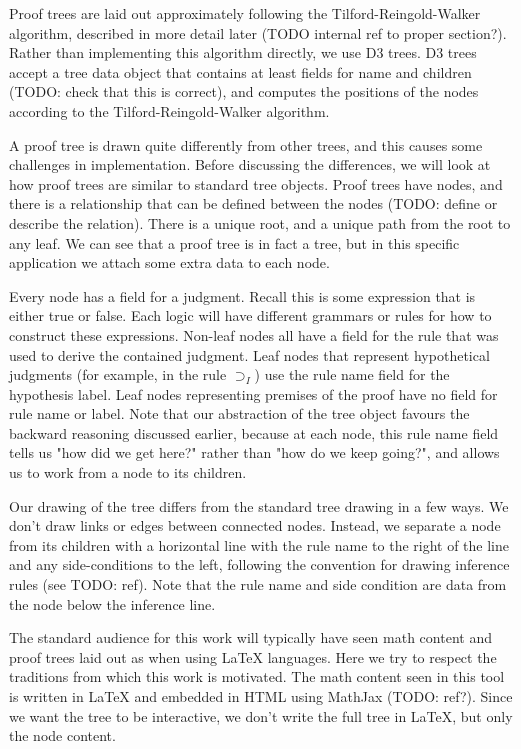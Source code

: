 \documentclass[conference]{IEEEtran}
\begin{document}
Proof trees are laid out approximately following the Tilford-Reingold-Walker algorithm, described in more detail later (TODO internal ref to proper section?). Rather than implementing this algorithm directly, we use D3 trees. D3 trees accept a tree data object that contains at least fields for name and children (TODO: check that this is correct), and computes the positions of the nodes according to the Tilford-Reingold-Walker algorithm.

A proof tree is drawn quite differently from other trees, and this causes some challenges in implementation. Before discussing the differences, we will look at how proof trees are similar to standard tree objects. Proof trees have nodes, and there is a relationship that can be defined between the nodes (TODO: define or describe the relation). There is a unique root, and a unique path from the root to any leaf. We can see that a proof tree is in fact a tree, but in this specific application we attach some extra data to each node.

Every node has a field for a judgment. Recall this is some expression that is either true or false. Each logic will have different grammars or rules for how to construct these expressions. Non-leaf nodes all have a field for the rule that was used to derive the contained judgment. Leaf nodes that represent hypothetical judgments (for example, in the rule $\supset_I$) use the rule name field for the hypothesis label. Leaf nodes representing premises of the proof have no field for rule name or label. Note that our abstraction of the tree object favours the backward reasoning discussed earlier, because at each node, this rule name field tells us "how did we get here?" rather than "how do we keep going?", and allows us to work from a node to its children.

Our drawing of the tree differs from the standard tree drawing in a few ways. We don't draw links or edges between connected nodes. Instead, we separate a node from its children with a horizontal line with the rule name to the right of the line and any side-conditions to the left, following the convention for drawing inference rules (see TODO: ref). Note that the rule name and side condition are data from the node below the inference line.

The standard audience for this work will typically have seen math content and proof trees laid out as when using \LaTeX{} languages. Here we try to respect the traditions from which this work is motivated. The math content seen in this tool is written in \LaTeX{} and embedded in HTML using MathJax (TODO: ref?). Since we want the tree to be interactive, we don't write the full tree in \LaTeX{}, but only the node content.
\end{document}
